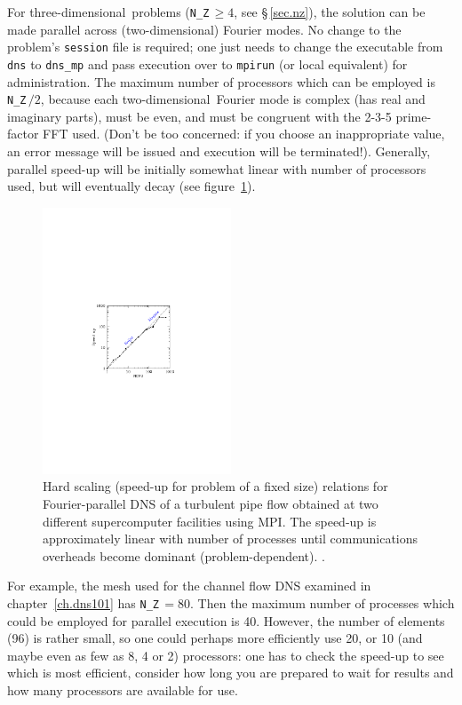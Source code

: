 \documentclass[11pt]{report}
\newcommand\twod{two-di\-men\-sion\-al}
\newcommand\threed{three-di\-men\-sion\-al}
\begin{document}
For \threed\ problems (\verb|N_Z|\,$\ge4$, see \S\,\ref{sec.nz}), the
solution can be made parallel across (\twod) Fourier modes.  No change
to the problem's \verb|session| file is required; one just needs to
change the executable from \verb|dns| to \verb|dns_mp| and pass
execution over to \verb|mpirun| (or local equivalent) for
administration.  The maximum number of processors which can be
employed is \verb|N_Z|\,$/2$, because each \twod\ Fourier mode is
complex (has real and imaginary parts), must be even, and must be
congruent with the 2-3-5 prime-factor FFT used.  (Don't be too
concerned: if you choose an inappropriate value, an error message will
be issued and execution will be terminated!).  Generally, parallel
speed-up will be initially somewhat linear with number of processors
used, but will eventually decay (see figure~\ref{fig:scaling}).

\begin{figure}
\begin{center}
  \includegraphics[width=0.5\textwidth]{HardScaling}
\end{center}
\caption{Hard scaling (speed-up for problem of a fixed size) relations
  for Fourier-parallel DNS of a turbulent pipe flow obtained at two
  different supercomputer facilities using MPI. The speed-up is
  approximately linear with number of processes until communications
  overheads become dominant (problem-dependent).  \citep[Reproduced
    from][]{blas19}.}
\label{fig:scaling}
\end{figure}

For example, the mesh used for the channel flow DNS examined in
chapter~\ref{ch.dns101} has \verb|N_Z|\,$=80$.  Then the maximum
number of processes which could be employed for parallel execution is
40.  However, the number of elements (96) is rather small, so one
could perhaps more efficiently use 20, or 10 (and maybe even as few as
8, 4 or 2) processors: one has to check the speed-up to see which is
most efficient, consider how long you are prepared to wait for results
and how many processors are available for use.
\end{document}
